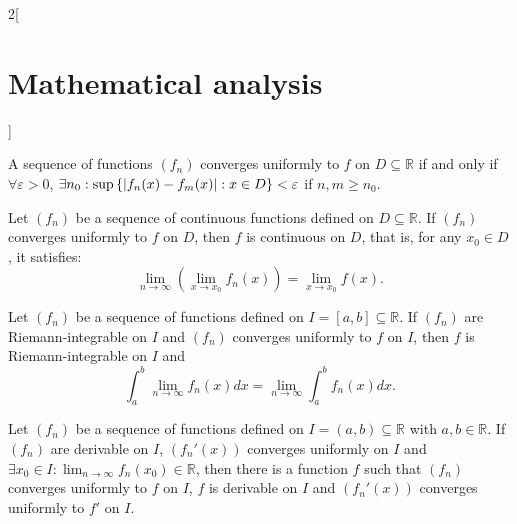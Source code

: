 \documentclass[class=article,crop=false]{standalone}
\begin{document}
\begin{multicols}{2}[\section{Mathematical analysis}]
\begin{theorem}
A sequence of functions $(f_n)$ converges uniformly to $f$ on $D\subseteq\mathbb{R}$ if and only if $\forall\varepsilon>0$, $\displaystyle\exists n_0:\sup\left\{|f_n(x)-f_m(x)|:\\ x\in D\right\}< \varepsilon$ if $n,m\geq n_0$.
\end{theorem}
\begin{theorem}
Let $(f_n)$ be a sequence of continuous functions defined on $D\subseteq\mathbb{R}$. If $(f_n)$ converges uniformly to $f$ on $D$, then $f$ is continuous on $D$, that is, for any $x_0\in D$, it satisfies: $$\lim_{n\to\infty}\left(\lim_{x\to x_0} f_n(x)\right)=\lim_{x\to x_0} f(x).$$
\end{theorem}
\begin{theorem}
Let $(f_n)$ be a sequence of functions defined on  $I=[a,b]\subseteq\mathbb{R}$. If $(f_n)$ are Riemann-integrable on $I$ and $(f_n)$ converges uniformly to $f$ on $I$, then $f$ is Riemann-integrable on $I$ and $$\int_a^b\lim_{n\to\infty} f_n(x) dx=\lim_{n\to\infty} \int_a^bf_n(x) dx.$$
\end{theorem}
\begin{theorem}
Let $(f_n)$ be a sequence of functions defined on $I=(a,b)\subseteq\mathbb{R}$ with $a,b\in\mathbb{R}$. If $(f_n)$ are derivable on $I$, $(f_n'(x))$ converges uniformly on $I$ and $\displaystyle\exists x_0\in I: \lim_{n\to\infty}f_n(x_0)\in\mathbb{R}$, then there is a function $f$ such that $(f_n)$ converges uniformly to $f$ on $I$, $f$ is derivable on $I$ and $(f_n'(x))$ converges uniformly to $f'$ on $I$.
\end{theorem}

\end{multicols}
\end{document}
